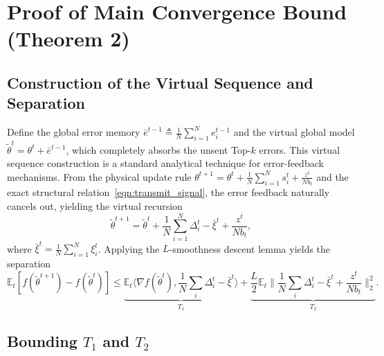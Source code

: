 \documentclass[conference]{IEEEtran}
\begin{document}
\section{Proof of Main Convergence Bound (Theorem 2)}

\subsection{Construction of the Virtual Sequence and Separation}
Define the global error memory $\bar{e}^{t-1} \triangleq \frac{1}{N} \sum_{i=1}^N e_i^{t-1}$ and the virtual global model $\tilde{\theta}^t = \theta^t + \bar{e}^{t-1}$, which completely absorbs the unsent Top-$k$ errors. This virtual sequence construction is a standard analytical technique for error-feedback mechanisms.
From the physical update rule $\theta^{t+1} = \theta^t + \frac{1}{N} \sum_{i=1}^N s_i^t + \frac{z^t}{N b_t}$ and the exact structural relation~\eqref{eqn:transmit_signal}, the error feedback naturally cancels out, yielding the virtual recursion
\begin{equation}
    \tilde{\theta}^{t+1} = \tilde{\theta}^t + \frac{1}{N} \sum_{i=1}^N \Delta_i^t - \bar{\xi}^t + \frac{z^t}{N b_t},
\end{equation}
where $\bar{\xi}^t = \frac{1}{N} \sum_{i=1}^N \xi_i^t$.
Applying the $L$-smoothness descent lemma yields the separation
\begin{equation}
    \mathbb{E}_t [f(\tilde{\theta}^{t+1}) - f(\tilde{\theta}^t)] \le \underbrace{\mathbb{E}_t \langle \nabla f(\tilde{\theta}^t), \frac{1}{N}\sum_{i}\Delta_i^t - \bar{\xi}^t \rangle}_{T_1} + \underbrace{\frac{L}{2} \mathbb{E}_t \Big\|\frac{1}{N}\sum_{i}\Delta_i^t - \bar{\xi}^t + \frac{z^t}{N b_t}\Big\|_2^2}_{T_2}.
\end{equation}

\subsection{Bounding $T_1$ and $T_2$}
\end{document}
